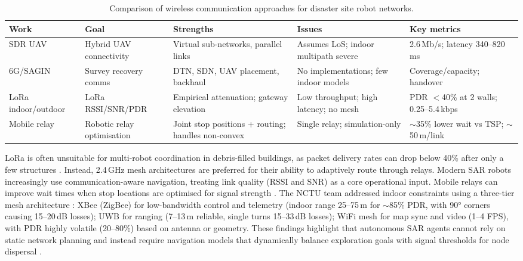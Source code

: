 \begin{table}[htbp]
\caption{Comparison of wireless communication approaches for disaster site robot networks.}
\label{tab:comms_compare}
\centering
\small
\begin{tabular}{p{1.8cm}p{1.6cm}p{2.2cm}p{2.2cm}p{2cm}}
\toprule
\textbf{Work} & \textbf{Goal} & \textbf{Strengths} & \textbf{Issues} & \textbf{Key metrics} \\
\midrule
SDR UAV \cite{rukaiya2024} & Hybrid UAV connectivity & Virtual sub-networks, parallel links & Assumes LoS; indoor multipath severe & 2.6\,Mb/s; latency 340--820\,ms \\
6G/SAGIN \cite{matracia2022} & Survey recovery comms & DTN, SDN, UAV placement, backhaul & No implementations; few indoor models & Coverage/capacity; handover \\
LoRa indoor/outdoor \cite{saban2021} & LoRa RSSI/SNR/PDR & Empirical attenuation; gateway elevation & Low throughput; high latency; no mesh & PDR $<$40\% at 2 walls; 0.25--5.4\,kbps \\
Mobile relay \cite{hurst2023} & Robotic relay optimisation & Joint stop positions + routing; handles non-convex & Single relay; simulation-only & $\sim$35\% lower wait vs TSP; $\sim$50\,m/link \\
\bottomrule
\end{tabular}
\end{table}

LoRa is often unsuitable for multi-robot coordination in debris-filled buildings, as packet delivery rates can drop below 40\% after only a few structures \cite{saban2021}. Instead, 2.4\,GHz mesh architectures are preferred for their ability to adaptively route through relays. Modern SAR robots increasingly use communication-aware navigation, treating link quality (RSSI and SNR) as a core operational input. Mobile relays can improve wait times when stop locations are optimised for signal strength \cite{hurst2023}. The NCTU team addressed indoor constraints using a three-tier mesh architecture \cite{lu2022}: XBee (ZigBee) for low-bandwidth control and telemetry (indoor range 25--75\,m for $\sim$85\% PDR, with 90° corners causing 15--20\,dB losses); UWB for ranging (7--13\,m reliable, single turns 15--33\,dB losses); WiFi mesh for map sync and video (1--4 FPS), with PDR highly volatile (20--80\%) based on antenna or geometry. These findings highlight that autonomous SAR agents cannot rely on static network planning and instead require navigation models that dynamically balance exploration goals with signal thresholds for node dispersal \cite{lu2022}.

